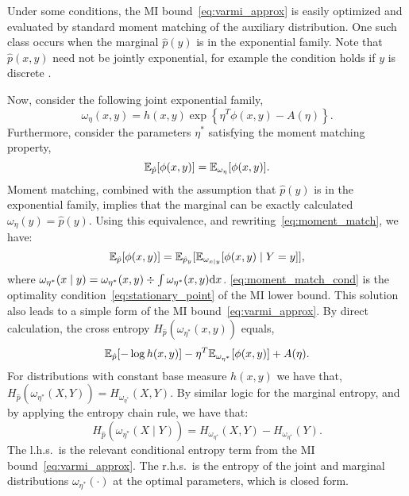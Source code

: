 

Under some conditions, the MI bound~\eqref{eq:varmi_approx} is easily
optimized and evaluated by standard moment matching of the auxiliary
distribution.  One such class occurs when the marginal $\hat{p}(y)$ is
in the exponential family.  Note that $\hat{p}(x,y)$ need not be
jointly exponential, for example the condition holds if $y$ is discrete .

Now, consider the following joint exponential family,
\[
  \omega_{\eta}(x,y) = h(x,y)\exp\left\{ \eta^T \phi(x,y) - A(\eta)
    \right\}.
\]
Furthermore, consider the parameters $\eta^*$ satisfying the moment
matching property,
\begin{equation}\label{eq:moment_match}
  \mathbb{E}_{\hat{p}}[ \phi(x,y) ] = \mathbb{E}_{\omega_{\eta}}[ \phi(x,y) ].
\end{equation}
Moment matching, combined with the assumption that $\hat{p}(y)$ is in
the exponential family, implies that the marginal can be exactly
calculated $\omega_{\eta}(y) = \hat{p}(y)$.  Using this equivalence,
and rewriting~\eqref{eq:moment_match}, we have:
\begin{equation}\label{eq:moment_match_cond}
  \mathbb{E}_{\hat{p}}[ \phi(x,y) ] = \mathbb{E}_{\hat{p}_y}[ \mathbb{E}_{\omega_{x\mid y}}[ \phi(x,y)
      \mid Y=y ] ],
\end{equation}
where $\omega_{\eta^{*}}(x\mid y)
= \omega_{\eta^{*}}(x,y) \div \int \omega_{\eta^{*}}(x,y) \mathrm{d}
x$.  \EQN\eqref{eq:moment_match_cond} is the optimality
condition~\eqref{eq:stationary_point} of the MI lower bound.  This
solution also leads to a simple form of the MI
bound~\eqref{eq:varmi_approx}.  By direct calculation, the cross
entropy $H_{\hat{p}}(\omega_{\eta^*}(x,y))$ equals,
\begin{equation}
  \mathbb{E}_{\hat{p}}[ - \log h(x,y) ] - \eta^T \mathbb{E}_{\omega_{\eta^*}}[ \phi(x,y) ] + A(\eta).
\end{equation}
For distributions with constant base measure $h(x,y)$ we have that,
$H_{\hat{p}}(\omega_{\eta^*}(X,Y)) = H_{\omega_{\eta^*}}(X,Y)$.  By
similar logic for the marginal entropy, and by applying the entropy
chain rule, we have that:
\begin{equation}
  H_{\hat{p}}( \omega_{\eta^*}(X\mid Y) ) = H_{\omega_{\eta^*}}(X,Y)
    - H_{\omega_{\eta^*}}(Y).
\end{equation}
The l.h.s.~is the relevant conditional entropy term from the MI
bound~\eqref{eq:varmi_approx}.  The r.h.s.~is the entropy of the joint
and marginal distributions $\omega_{\eta^{*}}(\cdot)$ at the optimal parameters,
which is closed form.

